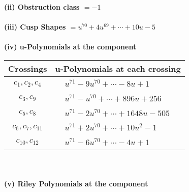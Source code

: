 \documentclass[1p]{elsarticle_modified}
\theoremstyle{definition}
\begin{document}
\flushleft \textbf{(ii) Obstruction class $= -1$}\\~\\
\flushleft \textbf{(iii) Cusp Shapes $= u^{70}+4 u^{69}+\cdots+10 u-5$}\\~\\
\newpage\renewcommand{\arraystretch}{1}
\flushleft \textbf{(iv) u-Polynomials at the component}\newline \\
\begin{tabular}{m{50pt}|m{274pt}}
Crossings & \hspace{64pt}u-Polynomials at each crossing \\
\hline $$\begin{aligned}c_{1},c_{2},c_{4}\end{aligned}$$&$\begin{aligned}
&u^{71}-9 u^{70}+\cdots-8 u+1
\end{aligned}$\\
\hline $$\begin{aligned}c_{3},c_{9}\end{aligned}$$&$\begin{aligned}
&u^{71}- u^{70}+\cdots+896 u+256
\end{aligned}$\\
\hline $$\begin{aligned}c_{5},c_{8}\end{aligned}$$&$\begin{aligned}
&u^{71}-2 u^{70}+\cdots+1648 u-505
\end{aligned}$\\
\hline $$\begin{aligned}c_{6},c_{7},c_{11}\end{aligned}$$&$\begin{aligned}
&u^{71}+2 u^{70}+\cdots+10 u^2-1
\end{aligned}$\\
\hline $$\begin{aligned}c_{10},c_{12}\end{aligned}$$&$\begin{aligned}
&u^{71}-6 u^{70}+\cdots-4 u+1
\end{aligned}$\\
\hline
\end{tabular}\\~\\
\newpage\renewcommand{\arraystretch}{1}
\flushleft \textbf{(v) Riley Polynomials at the component}\newline \\
\end{document}
